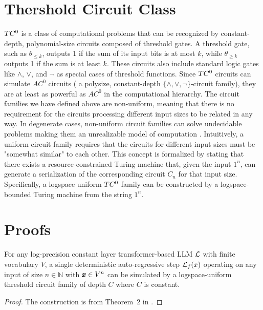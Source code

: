 \section{Thershold Circuit Class}
\label{appen:threshInfo}
$TC^{0}$ is a class of computational problems that can be recognized by constant-depth, polynomial-size circuits composed of threshold gates. A threshold gate, such as $\theta_{\leq k}$, outputs 1 if the sum of its input bits is at most $ k $, while $\theta_{\geq k}$ outputs 1 if the sum is at least $ k $. These circuits also include standard logic gates like $\wedge$, $\vee$, and $\neg$ as special cases of threshold functions. Since $TC^{0}$ circuits can simulate $AC^{0}$ circuits ( a polysize, constant-depth $\{\wedge, \vee, \neg\}$-circuit family), they are at least as powerful as $AC^{0}$ in the computational hierarchy. The circuit families we have defined above are non-uniform, meaning that there is no requirement for the circuits processing different input sizes to be related in any way. In degenerate cases, non-uniform circuit families can solve undecidable problems making them an unrealizable model of computation \cite{complexityBook}. Intuitively, a uniform circuit family requires that the circuits for different input sizes must be "somewhat similar" to each other. This concept is formalized by stating that there exists a resource-constrained Turing machine that, given the input $ 1^n $, can generate a serialization of the corresponding circuit $ C_n $ for that input size. Specifically, a logspace uniform $TC^{0}$ family can be constructed by a logspace-bounded Turing machine from the string $1^n$.

\section{Proofs}
\label{sec:proof}
\begin{lemma}
\label{lem:constrainLem}
For any log-precision constant layer transformer-based LLM $\mathcal{L}{}$ with finite vocabulary $V$, a single deterministic auto-regressive step $\mathcal{L}_{f}(x)$ operating on any input of size $n \in \mathbb{N}$ with $\pmb{x} \in V^{n}$ can be simulated by a logspace-uniform threshold circuit family of depth $C$ where $C$ is constant.
\end{lemma}
\begin{proof}
The construction is from Theorem~2 in \cite{tc0}.
\end{proof}

